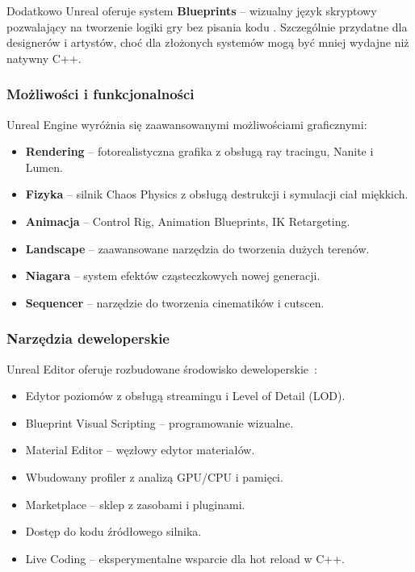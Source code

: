 Dodatkowo Unreal oferuje system \textbf{Blueprints} -- 
wizualny język skryptowy pozwalający na tworzenie logiki gry 
bez pisania kodu \cite{unreal_docs}. Szczególnie przydatne dla 
designerów i artystów, choć dla złożonych systemów mogą 
być mniej wydajne niż natywny C++.

\subsubsection{Możliwości i funkcjonalności}

Unreal Engine wyróżnia się zaawansowanymi możliwościami graficznymi:

\begin{itemize}
    \item \textbf{Rendering} -- fotorealistyczna grafika z obsługą ray tracingu, Nanite i Lumen.
    \item \textbf{Fizyka} -- silnik Chaos Physics z obsługą destrukcji i symulacji ciał miękkich.
    \item \textbf{Animacja} -- Control Rig, Animation Blueprints, IK Retargeting.
    \item \textbf{Landscape} -- zaawansowane narzędzia do tworzenia dużych terenów.
    \item \textbf{Niagara} -- system efektów cząsteczkowych nowej generacji.
    \item \textbf{Sequencer} -- narzędzie do tworzenia cinematików i cutscen.
\end{itemize}

\subsubsection{Narzędzia deweloperskie}

Unreal Editor oferuje rozbudowane środowisko deweloperskie~\cite{unreal_docs}:
\begin{itemize}
    \item Edytor poziomów z obsługą streamingu i Level of Detail (LOD).
    \item Blueprint Visual Scripting -- programowanie wizualne.
    \item Material Editor -- węzłowy edytor materiałów.
    \item Wbudowany profiler z analizą GPU/CPU i pamięci.
    \item Marketplace -- sklep z zasobami i pluginami.
    \item Dostęp do kodu źródłowego silnika.
    \item Live Coding -- eksperymentalne wsparcie dla hot reload w C++.
\end{itemize}

